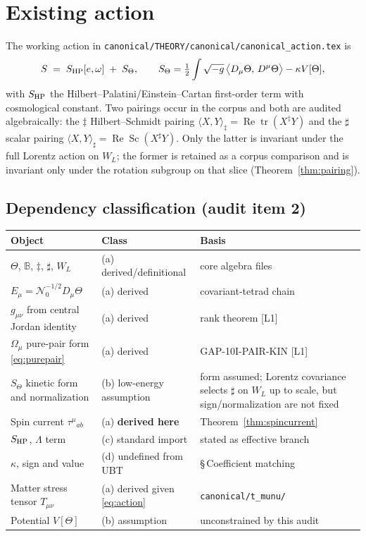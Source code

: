\documentclass[11pt,a4paper]{article}
\newcommand{\B}{\mathbb B}
\newcommand{\dd}{\ddagger}
\begin{document}
\section{Existing action}
The working action in \texttt{canonical/THEORY/canonical/canonical\_action.tex}
is
\begin{equation}
  S \;=\; S_{\rm HP}[e,\omega] \;+\; S_\Theta,\qquad
  S_\Theta=\tfrac12\int\sqrt{-g}\,\big\langle D_\mu\Theta,\,D^\mu\Theta\big\rangle
  -\kappa V[\Theta],
  \label{eq:action}
\end{equation}
with $S_{\rm HP}$ the Hilbert--Palatini/Einstein--Cartan first-order term
with cosmological constant.  Two pairings occur in the corpus and both are
audited algebraically: the $\dd$ Hilbert--Schmidt pairing
$\langle X,Y\rangle_{\dd}=\operatorname{Re}\operatorname{tr}(X^{\dd}Y)$
and the $\sharp$ scalar pairing
$\langle X,Y\rangle_{\sharp}=\operatorname{Re}\operatorname{Sc}(X^\sharp Y)$.
Only the latter is invariant under the full Lorentz action on $W_L$; the
former is retained as a corpus comparison and is invariant only under the
rotation subgroup on that slice (Theorem~\ref{thm:pairing}).

\subsection*{Dependency classification (audit item 2)}
\begin{center}
\begin{tabular}{@{}llp{7.2cm}@{}}
\toprule
Object & Class & Basis \\
\midrule
$\Theta$, $\B$, $\dd$, $\sharp$, $W_L$ & (a) derived/definitional & core algebra files \\
$E_\mu=\mathcal N_0^{-1/2}D_\mu\Theta$ & (a) derived & covariant-tetrad chain \\
$g_{\mu\nu}$ from central Jordan identity & (a) derived & rank theorem [L1] \\
$\Omega_\mu$ pure-pair form \eqref{eq:purepair} & (a) derived & GAP-10I-PAIR-KIN [L1] \\
$S_\Theta$ kinetic form and normalization & (b) low-energy assumption & form assumed; Lorentz covariance selects $\sharp$ on $W_L$ up to scale, but sign/normalization are not fixed \\
Spin current $\tau^{\mu}{}_{ab}$ & (a) \textbf{derived here} & Theorem~\ref{thm:spincurrent} \\
$S_{\rm HP}$, $\Lambda$ term & (c) standard import & stated as effective branch \\
$\kappa$, sign and value & (d) undefined from UBT & \S\,Coefficient matching \\
Matter stress tensor $T_{\mu\nu}$ & (a) derived given \eqref{eq:action} & \texttt{canonical/t\_munu/} \\
Potential $V[\Theta]$ & (b) assumption & unconstrained by this audit \\
\bottomrule
\end{tabular}
\end{center}
\end{document}

